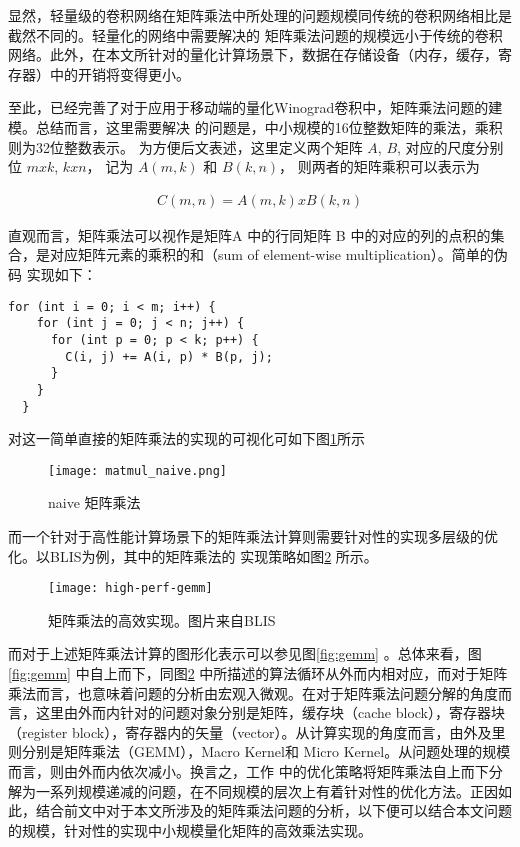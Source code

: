 显然，轻量级的卷积网络在矩阵乘法中所处理的问题规模同传统的卷积网络相比是截然不同的。轻量化的网络中需要解决的
矩阵乘法问题的规模远小于传统的卷积网络。此外，在本文所针对的量化计算场景下，数据在存储设备（内存，缓存，寄存器）中的开销将变得更小。


至此，已经完善了对于应用于移动端的量化Winograd卷积中，矩阵乘法问题的建模。总结而言，这里需要解决
的问题是，中小规模的16位整数矩阵的乘法，乘积则为32位整数表示。 为方便后文表述，这里定义两个矩阵 $A$, $B$, 对应的尺度分别位 $m x k$, $k x n$， 记为 $A(m, k) $ 和 $ B(k, n) $， 则两者的矩阵乘积可以表示为

\begin{align}
  C(m, n) = A(m, k) x B(k, n)
\end{align}

直观而言，矩阵乘法可以视作是矩阵A 中的行同矩阵 B 中的对应的列的点积的集合，是对应矩阵元素的乘积的和（sum of element-wise multiplication）。简单的伪码
实现如下：

\begin{lstlisting}[label={code:matmul_naive}, caption={矩阵乘法}]
  for (int i = 0; i < m; i++) {
    for (int j = 0; j < n; j++) {
      for (int p = 0; p < k; p++) {
        C(i, j) += A(i, p) * B(p, j);
      }
    }
  }
\end{lstlisting}

对这一简单直接的矩阵乘法的实现的可视化可如下图\ref{fig:naive_matmul}所示

\begin{figure}
\centering
\texttt{[image: matmul\_naive.png]}
\caption{naive 矩阵乘法}
\label{fig:naive_matmul}
\end{figure}

而一个针对于高性能计算场景下的矩阵乘法计算则需要针对性的实现多层级的优化。以BLIS\cite{BLIS1}为例，其中的矩阵乘法的
实现策略如图\ref{fig:blis-gemm} 所示。

\begin{figure}
  \centering
  \texttt{[image: high-perf-gemm]}
  \caption{矩阵乘法的高效实现。图片来自BLIS\protect\cite{Low2016AnalyticalMI}}
  \label{fig:blis-gemm}
\end{figure}

而对于上述矩阵乘法计算的图形化表示可以参见图\ref{fig:gemm} 。总体来看，图\ref{fig:gemm} 中自上而下，同图\ref{fig:blis-gemm} 中所描述的算法循环从外而内相对应，而对于矩阵乘法而言，也意味着问题的分析由宏观入微观。在对于矩阵乘法问题分解的角度而言，这里由外而内针对的问题对象分别是矩阵，缓存块（cache block），寄存器块（register block），寄存器内的矢量（vector）。从计算实现的角度而言，由外及里则分别是矩阵乘法（GEMM），Macro Kernel和 Micro Kernel。从问题处理的规模而言，则由外而内依次减小。换言之，工作\cite{BLIS1} 中的优化策略将矩阵乘法自上而下分解为一系列规模递减的问题，在不同规模的层次上有着针对性的优化方法。正因如此，结合前文中对于本文所涉及的矩阵乘法问题的分析，以下便可以结合本文问题的规模，针对性的实现中小规模量化矩阵的高效乘法实现。

